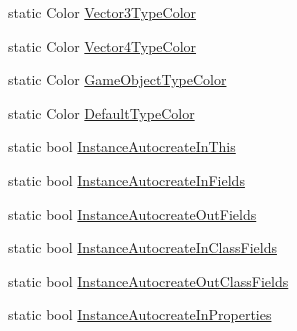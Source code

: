 \begin{DoxyCompactItemize}
\item 
static Color \hyperlink{classi_c_s___preferences_controller_acec3d9946273c4bb88391b4f20677e7f}{Vector3\+Type\+Color}
\item 
static Color \hyperlink{classi_c_s___preferences_controller_ab7c50b8ba536bbae66f0db236322f72b}{Vector4\+Type\+Color}
\item 
static Color \hyperlink{classi_c_s___preferences_controller_ad80951e5cf9555ebbcaea0d1f8104b54}{Game\+Object\+Type\+Color}
\item 
static Color \hyperlink{classi_c_s___preferences_controller_ac0646c9ee8cbf418e19f52a0ab1f65fb}{Default\+Type\+Color}
\item 
static bool \hyperlink{classi_c_s___preferences_controller_a6d4c4a652e4471afa6bbc319cd3e98e9}{Instance\+Autocreate\+In\+This}
\item 
static bool \hyperlink{classi_c_s___preferences_controller_a20ad351759e200fc90c6947ea34abca7}{Instance\+Autocreate\+In\+Fields}
\item 
static bool \hyperlink{classi_c_s___preferences_controller_a38a3b09589c384511a8e780a04c8bba9}{Instance\+Autocreate\+Out\+Fields}
\item 
static bool \hyperlink{classi_c_s___preferences_controller_abe8ef5ada3d3117d682d42d5076fb4f9}{Instance\+Autocreate\+In\+Class\+Fields}
\item 
static bool \hyperlink{classi_c_s___preferences_controller_a8efe189f0a12274ce5d1f9f370e0accc}{Instance\+Autocreate\+Out\+Class\+Fields}
\item 
static bool \hyperlink{classi_c_s___preferences_controller_a174c5eb8a962e28513833aa01079d328}{Instance\+Autocreate\+In\+Properties}

\end{DoxyCompactItemize}
